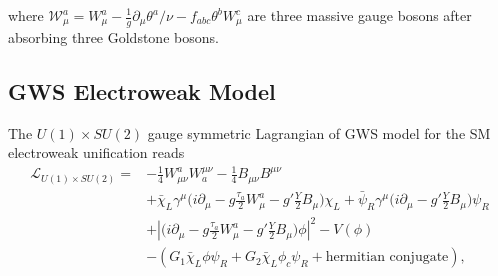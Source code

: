 \noindent where $\mathcal{W}^a_\mu = W^a_\mu - \frac{1}{g} \partial_\mu \theta^a / \nu - f_{abc}\theta^b W^c_\mu$ are three massive gauge bosons after absorbing three Goldstone bosons.



\subsection{GWS Electroweak Model}
\label{sec:relatedWorks:qft:gws}
The $U(1) \times SU(2)$ gauge symmetric Lagrangian of GWS model for the SM electroweak unification reads 
\begin{equation}
\begin{split}
    \mathcal{L}_{U(1)\times SU(2)} =&  - \frac{1}{4}W^a_{\mu\nu}W^{\mu\nu}_a - \frac{1}{4}B_{\mu\nu}B^{\mu\nu} \\
    & + \bar{\chi}_L \gamma^\mu \big( i \partial_\mu -g \frac{\tau_a}{2} W^a_\mu -g'\frac{Y}{2} B_\mu \big) \chi_L 
    + \bar{\psi}_R \gamma^\mu \big( i \partial_\mu -g'\frac{Y}{2} B_\mu \big) \psi_R \\
    & + \left\lvert  \big( i \partial_\mu -g \frac{\tau_a}{2} W^a_\mu -g'\frac{Y}{2} B_\mu \big)\phi \right\rvert ^2 - V(\phi) \\
    & -(G_1 \bar{\chi}_L \phi \psi_R + G_2 \bar{\chi}_L \phi_c \psi_R + \text{hermitian conjugate}) ,
\end{split}
\label{eqn:relatedWorks:qft:gws:lagragian}
\end{equation}

